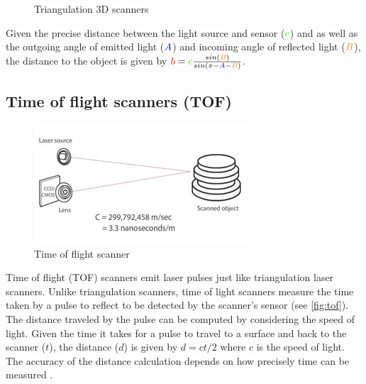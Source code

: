 \begin{figure}[H]
\begin{subfigure}[b]{.33\textwidth}
		\caption{}
	\end{subfigure}
	\caption{Triangulation 3D scanners \protect\footnotemark}
	\label{fig:triangulation-scanners}
\end{figure}

Given the precise distance between the light source and sensor ($\begingroup\color{green}c\endgroup$) and as well as the outgoing angle of emitted light ($\begingroup\color{blue}A\endgroup$) and incoming angle of reflected light ($\begingroup\color{orange}B\endgroup$), the distance to the object is given by $\begingroup\color{red}b\endgroup = \begingroup\color{green}c\endgroup\frac{ sin(\begingroup\color{orange}B\endgroup)}{sin(\pi - \begingroup\color{blue}A\endgroup-\begingroup\color{orange}B\endgroup)}$.

\subsection{Time of flight scanners (TOF)} \label{subsec:tof}

\begin{figure}[ht]
  \centering
  \includegraphics[width=.5\linewidth]{images/pulse-tof}
  \caption[Time of flight scanner]{Time of flight scanner \protect\footnotemark[\value{footnote}]}
  \label{fig:tof}
\end{figure}

Time of flight (TOF) scanners emit laser pulses just like triangulation laser scanners. Unlike triangulation scanners, time of light scanners measure the time taken by a pulse to reflect to be detected by the scanner's sensor (see \autoref{fig:tof}). The distance traveled by the pulse can be computed by considering the speed of light. Given the time it takes for a pulse to travel to a surface and back to the scanner ($t$), the distance ($d$) is given by $d = ct/2$ where $c$ is the speed of light. The accuracy of the distance calculation depends on how precisely time can be measured \cite{Form2014}.

